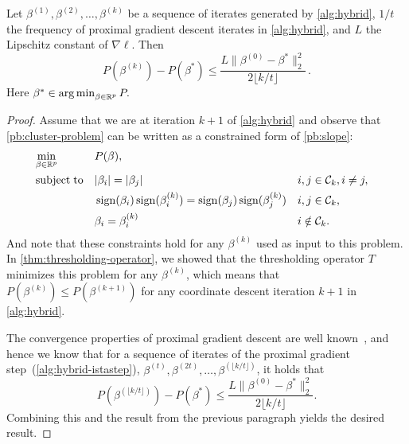 \begin{lemma}
  Let \(\beta^{(1)}, \beta^{(2)}, \dots, \beta^{(k)}\) be a sequence of
  iterates generated by \cref{alg:hybrid}, \(1/t\) the frequency of proximal gradient
  descent iterates in \cref{alg:hybrid}, and \(L\) the Lipschitz constant of
  \(\nabla \ell\). Then
  \[
    P(\beta^{(k)}) - P(\beta^*) \leq \frac{L \lVert \beta^{(0)} - \beta^* \rVert_2^2}{2\lfloor k/t \rfloor }\,.
  \]
  Here \(  \beta^* \in \operatorname*{arg\,min}_{\beta \in \mathbb{R}^p} P.\)
\end{lemma}
\begin{proof}
  Assume that we are at iteration \(k + 1\)  of \cref{alg:hybrid} and observe
  that \cref{pb:cluster-problem} can be written as a constrained form of \cref{pb:slope}:
  \[
    \begin{aligned}
       & \min_{\beta \in \mathbb{R}^p} &  & P(\beta),                                                                                                     \\
       & \operatorname{subject\;to}    &  & |\beta_i| = |\beta_j|                                                   &  & i,j \in \mathcal{C}_k, i \neq j, \\
       &                               &  & \operatorname{sign}(\beta_i)\operatorname{sign}(\beta_i^{(k)}) = \operatorname{sign}(\beta_j)\operatorname{sign}(\beta_j^{(k)}) &  & i,j \in \mathcal{C}_k,           \\
       &                               &  & \beta_i = \beta_i^{(k)}                                                 &  & i \notin \mathcal{C}_k.
    \end{aligned}
  \]
  And note that these constraints hold for any \(\beta^{(k)}\) used as input to this
  problem.
  In \cref{thm:thresholding-operator}, we showed that the thresholding operator
  \(T\) minimizes this problem for any \(\beta^{(k)}\), which means that
  \(P(\beta^{(k)}) \leq P(\beta^{(k + 1)})\) for any coordinate descent iteration
  \(k + 1\) in \cref{alg:hybrid}.

  The convergence properties of proximal gradient descent are well
  known~\parencite{beck2009,daubechies2004}, and hence we know that for a
  sequence of iterates of the proximal gradient step~(\cref{alg:hybrid-istastep}),
  \(\beta^{(t)}, \beta^{(2t)}, \dots, \beta^{(\lfloor k / t \rfloor)}\), it holds that
  \[
    P(\beta^{(\lfloor k / t \rfloor)}) - P(\beta^*)
    \leq \frac{L \lVert \beta^{(0)} - \beta^* \rVert_2^2}{2\lfloor k / t \rfloor}.
  \]
  Combining this and the result from the previous paragraph yields the desired
  result.
\end{proof}


